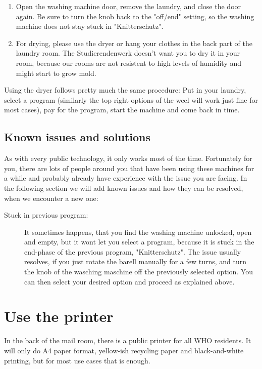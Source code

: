\begin{enumerate}
    \item Open the washing machine door, remove the laundry, and close the door again. Be sure to turn the knob back to the "off/end" setting, so the washing machine does not stay stuck in "Knitterschutz".    
    
    \item For drying, please use the dryer or hang your clothes in the back part of the laundry room. The Studierendenwerk doesn't want you to dry it in your room, because our rooms are not resistent to high levels of humidity and might start to grow mold.
\end{enumerate}

Using the dryer follows pretty much the same procedure: Put in your laundry, select a program (similarly the top right options of the weel will work just fine for most cases), pay for the program, start the machine and come back in time.

\subsection{Known issues and solutions}
As with every public technology, it only works most of the time. Fortunately for you, there are lots of people around you that have been using these machines for a while and probably already have experience with the issue you are facing. In the following section we will add known issues and how they can be resolved, when we encounter a new one:
\begin{description}
    \item[Stuck in previous program:] It sometimes happens, that you find the washing machine unlocked, open and empty, but it wont let you select a program, because it is stuck in the end-phase of the previous program, "Knitterschutz". The issue usually resolves, if you just rotate the barell manually for a few turns, and turn the knob of the wasching maschine off the previously selected option. You can then select your desired option and proceed as explained above.
\end{description}

\section{Use the printer}
In the back of the mail room, there is a public printer for all WHO residents. It will only do A4 paper format, yellow-ish recycling paper and black-and-white printing, but for most use cases that is enough.

